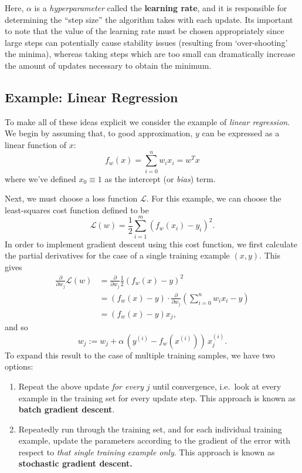 \documentclass[../main.tex]{subfiles}
\begin{document}
Here, $\alpha$ is a \emph{hyperparameter} called the \textbf{learning rate}, and it is responsible for determining the
``step size'' the algorithm takes with each update.
%
Its important to note that the value of the learning rate must be chosen appropriately since large steps can
potentially cause stability issues (resulting from `over-shooting' the minima), whereas taking steps which are too
small can dramatically increase the amount of updates necessary to obtain the minimum.
%
\subsection{Example: Linear Regression}%
\label{subsec:linear_regression}
To make all of these ideas explicit we consider the example of \emph{linear regression}. 
We begin by assuming that, to good approximation, $y$ can be expressed as a linear function of $x$:
%
\begin{equation}
  f_{w}(x) = \sum_{i=0}^{n} w_{i} x_{i} = w^{T} x
\end{equation}
%
where we've defined $x_{0} \equiv 1$ as the intercept (or \emph{bias}) term.

Next, we must choose a loss function $\mathcal{L}$.
%
For this example, we can choose the least-squares cost function defined to be
%
\begin{equation}
  \mathcal{L}(w) = \frac{1}{2}\sum_{i = 1}^{m} {\left(f_{w} (x_{i}) - y_{i} \right)}^{2}.
\end{equation}
%
In order to implement gradient descent using this cost function, we first calculate the partial derivatives for the
case of a single training example $(x, y)$. This gives
\begin{align}
  \frac{\partial}{\partial w_j} \mathcal{L}(w) 
    &= \frac{\partial}{\partial w_j} \frac{1}{2} {\left(f_{w}(x) - y\right)}^2 \\
    &= (f_w(x) - y) \cdot \frac{\partial}{\partial w_j} {\left(\sum_{i=0}^{n} w_i x_i - y\right)} \\
    & =(f_w(x) - y) x_j,
\end{align}
%
and so
\begin{equation}
  w_j := w_j + \alpha\, {\left(y^{(i)} - f_w(x^{(i)})\right)}\, x^{(i)}_j.
\end{equation}
%
To expand this result to the case of multiple training samples, we have two options:
\begin{enumerate}
  \item Repeat the above update \emph{for every} $j$ until convergence, i.e.\ look at every example in the training set
    for every update step. This approach is known as \textbf{batch gradient descent}.
  \item Repeatedly run through the training set, and for each individual training example, update the parameters
    according to the gradient of the error with respect to \emph{that single training example only}. This approach is
    known as \textbf{stochastic gradient descent.}
\end{enumerate}
\end{document}

